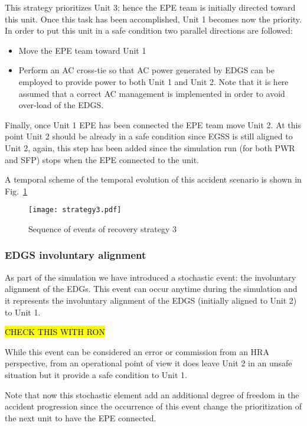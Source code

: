 This strategy prioritizes Unit 3; hence the EPE team is initially directed toward this unit. 
Once this task has been accomplished, Unit 1 becomes now the priority. In order to put this unit in a safe 
condition two parallel directions are followed: 

\begin{itemize}
  \item Move the EPE team toward Unit 1 
  \item Perform an AC cross-tie so that AC power generated by EDGS can be employed to provide power to both Unit
        1 and Unit 2. Note that it is here assumed that a correct AC management is implemented in order to avoid
        over-load of the EDGS.
\end{itemize}

Finally, once Unit 1 EPE has been connected the EPE team move Unit 2. At this point Unit 2 should be already in a 
safe condition since EGSS is still aligned to Unit 2, again, this step has been added since the simulation run (for 
both PWR and SFP) stops when the EPE connected to the unit.

A temporal scheme of the temporal evolution of this accident scenario is shown in Fig.~\ref{fig:strategy3Scheme}

\begin{figure}
    \centering
    \centerline{\texttt{[image: strategy3.pdf]}}
    \caption{Sequence of events of recovery strategy 3}
    \label{fig:strategy3Scheme}
\end{figure}

\subsubsection{EDGS involuntary alignment}
\label{sec:EDGSinvolAlign}

As part of the simulation we have introduced a stochastic event: the involuntary alignment of the EDGs.
This event can occur anytime during the simulation and it represents the involuntary alignment of the EDGS 
(initially aligned to Unit 2) to Unit 1. 

\hl{CHECK THIS WITH RON}

While this event can be considered an error or commission from an HRA perspective, from an operational point of view 
it does leave Unit 2 in an unsafe situation but it provide a safe condition to Unit 1. 

Note that now this stochastic element add an additional degree of freedom in the accident progression since the 
occurrence of this event change the prioritization of the next unit to have the EPE connected.

